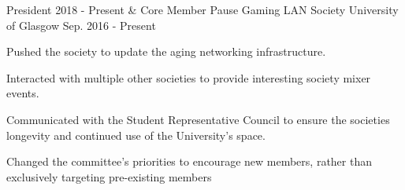 

\begin{cventries}

  \cventry
    {President 2018 - Present \& Core Member} %
    {Pause Gaming LAN Society} %
    {University of Glasgow} %
    {Sep. 2016 - Present} %
    {
      \begin{cvitems} %
        \item Pushed the society to update the aging networking infrastructure.
        \item Interacted with multiple other societies to provide interesting society mixer events.
	\item Communicated with the Student Representative Council to ensure the societies longevity and continued use of the University's space.
	\item Changed the committee's priorities to encourage new members, rather than exclusively targeting pre-existing members
      \end{cvitems}
    }

\end{cventries}
